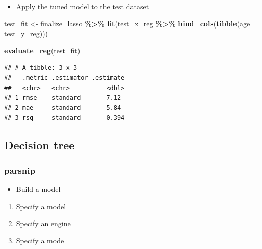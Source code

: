 \documentclass[
]{book}
\newenvironment{Shaded}{\begin{snugshade}}{\end{snugshade}}
\newcommand{\AttributeTok}[1]{\textcolor[rgb]{0.13,0.29,0.53}{#1}}
\newcommand{\FunctionTok}[1]{\textcolor[rgb]{0.13,0.29,0.53}{\textbf{#1}}}
\newcommand{\NormalTok}[1]{#1}
\newcommand{\OtherTok}[1]{\textcolor[rgb]{0.56,0.35,0.01}{#1}}
\newcommand{\SpecialCharTok}[1]{\textcolor[rgb]{0.81,0.36,0.00}{\textbf{#1}}}
\providecommand{\tightlist}{%
  \setlength{\itemsep}{0pt}\setlength{\parskip}{0pt}}
\begin{document}
\begin{itemize}
\tightlist
\item
  Apply the tuned model to the test dataset
\end{itemize}

\begin{Shaded}
\begin{Highlighting}[]
\NormalTok{test\_fit }\OtherTok{\textless{}{-}}\NormalTok{ finalize\_lasso }\SpecialCharTok{\%\textgreater{}\%}
  \FunctionTok{fit}\NormalTok{(test\_x\_reg }\SpecialCharTok{\%\textgreater{}\%} \FunctionTok{bind\_cols}\NormalTok{(}\FunctionTok{tibble}\NormalTok{(}\AttributeTok{age =}\NormalTok{ test\_y\_reg)))}

\FunctionTok{evaluate\_reg}\NormalTok{(test\_fit)}
\end{Highlighting}
\end{Shaded}

\begin{verbatim}
## # A tibble: 3 x 3
##   .metric .estimator .estimate
##   <chr>   <chr>          <dbl>
## 1 rmse    standard       7.12 
## 2 mae     standard       5.84 
## 3 rsq     standard       0.394
\end{verbatim}

\subsection{Decision tree}\label{decision-tree}

\subsubsection{parsnip}\label{parsnip-1}

\begin{itemize}
\tightlist
\item
  Build a model
\end{itemize}

\begin{enumerate}
\def\labelenumi{\arabic{enumi}.}
\tightlist
\item
  Specify a model
\item
  Specify an engine
\item
  Specify a mode
\end{enumerate}
\end{document}
